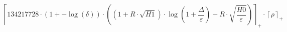 \[\left\lceil 134217728 \cdot \left(1 + -\log\left(\delta\right)\right) \cdot \left(\left(1 + R \cdot \sqrt{H1}\right) \cdot \log\left(1 + \frac{\Delta}{\varepsilon}\right) + R \cdot \sqrt{\frac{H0}{\varepsilon}}\right) \right\rceil_{+} \cdot \left\lceil \rho \right\rceil_{+}\]
